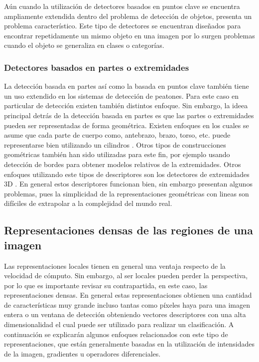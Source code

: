 Aún cuando la utilización de detectores basados en puntos clave se encuentra ampliamente extendida dentro del problema de detección de objetos, presenta un problema característico. Este tipo de detectores se encuentran diseñados para encontrar repetidamente un mismo objeto en una imagen por lo surgen problemas cuando el objeto se generaliza en clases o categorías.


\subsubsection{Detectores basados en partes o extremidades}

La detección basada en partes así como la basada en puntos clave también tiene un uso extendido en los sistemas de detección de peatones. Para este caso en particular de detección existen también distintos enfoque. Sin embargo, la ideea principal detrás de la detección basada en partes es que las partes o extremidades pueden ser representadas de forma geométrica. Existen enfoques en los cuales se asume que cada parte de cuerpo como, antebrazo, brazo, torso, etc.  puede representarse bien utilizando un cilindros \citep{Ramanan2003}. Otros tipos de construcciones geométricas también han sido utilizadas para este fin, por ejemplo usando detección de bordes para obtener modelos relativos de la extremidades. Otros enfoques utilizando este tipos de descriptores son los detectores de extremidades 3D \citep{Sigal2003}. En general estos descriptores funcionan bien, sin embargo presentan algunos problemas, pues la simplicidad de la representaciones geométricas con lineas son difíciles de extrapolar a la complejidad del mundo real.


\subsection{Representaciones densas de las regiones de una imagen}
\label{caract:densas}

Las representaciones locales tienen en general una ventaja respecto de la velocidad de cómputo. Sin embargo, al ser locales pueden perder la perspectiva, por lo que es importante revisar su contrapartida, en este caso, las representaciones densas. En general estas representaciones obtienen una cantidad de características muy grande incluso tantas como píxeles haya para una imagen entera o un ventana de detección obteniendo vectores descriptores con una alta dimensionalidad el cual puede ser utilizado para realizar un clasificación. 
A continuación se explicarán algunos enfoques relacionados con este tipo de representaciones, que están generalmente basadas en la utilización de intensidades de la imagen, gradientes u operadores diferenciales.


